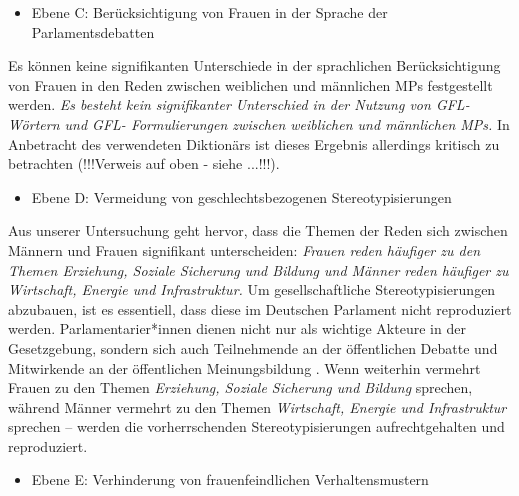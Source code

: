 \documentclass[12pt, 
    twoside=false, 
    bibliography=totoc, 
    numbers=endperiod, 
    headings=normal, 
    toc=chapterentrydotfill
    ]{scrbook}
\begin{document}
\begin{itemize}
    \item Ebene C: Berücksichtigung von Frauen in der Sprache der Parlamentsdebatten
\end{itemize}
Es können keine signifikanten Unterschiede in der sprachlichen Berücksichtigung von Frauen in den Reden zwischen weiblichen und männlichen MPs festgestellt werden. \emph{Es besteht kein signifikanter Unterschied in der Nutzung von GFL-Wörtern und GFL- Formulierungen zwischen weiblichen und männlichen MPs.} In Anbetracht des verwendeten Diktionärs ist dieses Ergebnis allerdings kritisch zu betrachten (!!!Verweis auf oben - siehe ...!!!).
    
\begin{itemize}
      \item Ebene D: Vermeidung von geschlechtsbezogenen Stereotypisierungen
\end{itemize}

Aus unserer Untersuchung geht hervor, dass die Themen der Reden sich zwischen Männern und Frauen signifikant unterscheiden: \emph{Frauen reden häufiger zu den Themen Erziehung, Soziale Sicherung und Bildung und Männer reden häufiger zu Wirtschaft, Energie und Infrastruktur.} Um gesellschaftliche Stereotypisierungen abzubauen, ist es essentiell, dass diese im Deutschen Parlament nicht reproduziert werden. Parlamentarier*innen dienen nicht nur als wichtige Akteure in der Gesetzgebung, sondern sich auch Teilnehmende an der öffentlichen Debatte und Mitwirkende an der öffentlichen Meinungsbildung \parencite[188]{dahlerup_2018}. Wenn weiterhin vermehrt Frauen zu den Themen \emph{Erziehung, Soziale Sicherung und Bildung} sprechen, während Männer vermehrt zu den Themen \emph{Wirtschaft, Energie und Infrastruktur} sprechen -- werden die vorherrschenden Stereotypisierungen aufrechtgehalten und reproduziert.
    
\begin{itemize}
    \item Ebene E: Verhinderung von frauenfeindlichen Verhaltensmustern
\end{itemize}


\end{document}
